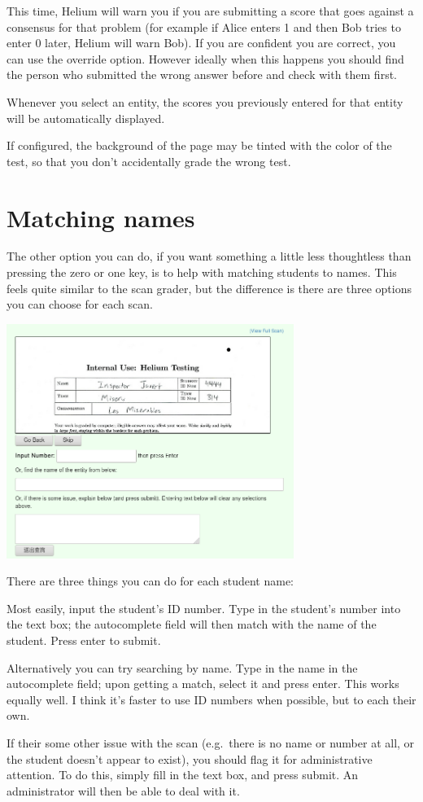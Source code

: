 This time, Helium will warn you if you are submitting
a score that goes against a consensus for that problem
(for example if Alice enters 1 and then Bob tries to enter 0 later,
Helium will warn Bob).
If you are confident you are correct, you can use the override option.
However ideally when this happens you should find the person
who submitted the wrong answer before and check with them first.

Whenever you select an entity,
the scores you previously entered for that
entity will be automatically displayed.

If configured, the background of the page may be tinted
with the color of the test, so that you don't accidentally grade
the wrong test.

\section{Matching names}
The other option you can do, if you want something a little
less thoughtless than pressing the zero or one key,
is to help with matching students to names.
This feels quite similar to the scan grader,
but the difference is there are three options you can choose
for each scan.

\begin{center}
	\includegraphics[width=0.7\textwidth]{images/fastmatch2.png}
\end{center}

There are three things you can do for each student name:
\begin{enumerate}
	\ii Most easily, input the student's ID number.
	Type in the student's number into the text box;
	the autocomplete field will then match with the name of the student.
	Press enter to submit.

	\ii Alternatively you can try searching by name.
	Type in the name in the autocomplete field;
	upon getting a match, select it and press enter.
	This works equally well.
	I think it's faster to use ID numbers when possible, but to each their own.

	\ii If their some other issue with the scan
	(e.g.\ there is no name or number at all,
	or the student doesn't appear to exist),
	you should flag it for administrative attention.
	To do this, simply fill in the text box, and press submit.
	An administrator will then be able to deal with it.
\end{enumerate}

